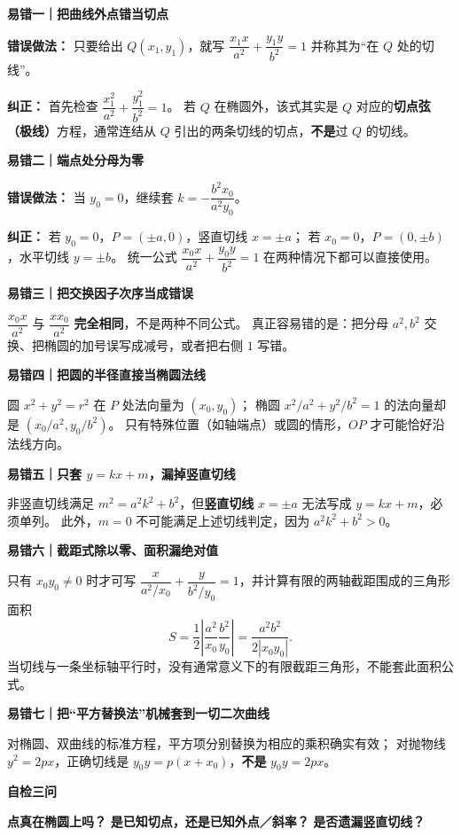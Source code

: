\begin{trapbox}
\textbf{\textcolor{CTrap}{易错一｜把曲线外点错当切点}}

\textbf{错误做法：} 只要给出 $Q(x_1,y_1)$，就写
$\dfrac{x_1x}{a^2}+\dfrac{y_1y}{b^2}=1$ 并称其为“在 $Q$ 处的切线”。

\textbf{纠正：} 首先检查 $\dfrac{x_1^2}{a^2}+\dfrac{y_1^2}{b^2}=1$。
若 $Q$ 在椭圆外，该式其实是 $Q$ 对应的\textbf{切点弦（极线）}方程，通常连结从 $Q$ 引出的两条切线的切点，\textbf{不是}过 $Q$ 的切线。

\medskip
\textbf{\textcolor{CTrap}{易错二｜端点处分母为零}}

\textbf{错误做法：} 当 $y_0=0$，继续套
$k=-\dfrac{b^2x_0}{a^2y_0}$。

\textbf{纠正：} 若 $y_0=0$，$P=(\pm a,0)$，竖直切线 $x=\pm a$；
若 $x_0=0$，$P=(0,\pm b)$，水平切线 $y=\pm b$。
统一公式 $\dfrac{x_0x}{a^2}+\dfrac{y_0y}{b^2}=1$ 在两种情况下都可以直接使用。

\medskip
\textbf{\textcolor{CTrap}{易错三｜把交换因子次序当成错误}}

$\dfrac{x_0x}{a^2}$ 与 $\dfrac{xx_0}{a^2}$ \textbf{完全相同}，不是两种不同公式。
真正容易错的是：把分母 $a^2,b^2$ 交换、把椭圆的加号误写成减号，或者把右侧 $1$ 写错。

\medskip
\textbf{\textcolor{CTrap}{易错四｜把圆的半径直接当椭圆法线}}

圆 $x^2+y^2=r^2$ 在 $P$ 处法向量为 $(x_0,y_0)$；
椭圆 $x^2/a^2+y^2/b^2=1$ 的法向量却是
$\left(x_0/a^2,y_0/b^2\right)$。
只有特殊位置（如轴端点）或圆的情形，$OP$ 才可能恰好沿法线方向。

\medskip
\textbf{\textcolor{CTrap}{易错五｜只套 $y=kx+m$，漏掉竖直切线}}

非竖直切线满足 $m^2=a^2k^2+b^2$，但\textbf{竖直切线} $x=\pm a$ 无法写成 $y=kx+m$，必须单列。
此外，$m=0$ 不可能满足上述切线判定，因为 $a^2k^2+b^2>0$。

\medskip
\textbf{\textcolor{CTrap}{易错六｜截距式除以零、面积漏绝对值}}

只有 $x_0y_0\ne0$ 时才可写
$\dfrac{x}{a^2/x_0}+\dfrac{y}{b^2/y_0}=1$，并计算有限的两轴截距围成的三角形面积
\[
 S=\frac12\left|\frac{a^2}{x_0}\frac{b^2}{y_0}\right|
 =\frac{a^2b^2}{2|x_0y_0|}.
\]
当切线与一条坐标轴平行时，没有通常意义下的有限截距三角形，不能套此面积公式。

\medskip
\textbf{\textcolor{CTrap}{易错七｜把“平方替换法”机械套到一切二次曲线}}

对椭圆、双曲线的标准方程，平方项分别替换为相应的乘积确实有效；
对抛物线 $y^2=2px$，正确切线是
$y_0y=p(x+x_0)$，\textbf{不是} $y_0y=2px$。

\medskip
\textbf{\textcolor{CTrap}{自检三问}}

\textbf{点真在椭圆上吗？}\quad
\textbf{是已知切点，还是已知外点／斜率？}\quad
\textbf{是否遗漏竖直切线？}
\end{trapbox}
